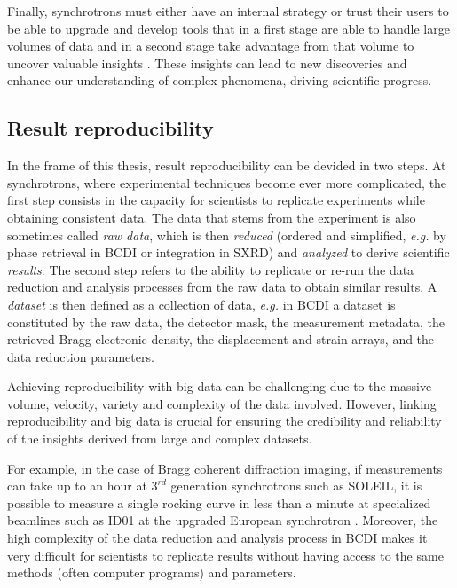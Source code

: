 Finally, synchrotrons must either have an internal strategy or trust their users to be able to upgrade and develop tools that in a first stage are able to handle large volumes of data and in a second stage take advantage from that volume to uncover valuable insights \parencite{WangIEEE2016, Khaleghi2019}.
These insights can lead to new discoveries and enhance our understanding of complex phenomena, driving scientific progress.


\subsection{Result reproducibility}

In the frame of this thesis, result reproducibility can be devided in two steps.
At synchrotrons, where experimental techniques become ever more complicated, the first step consists in the capacity for scientists to replicate experiments while obtaining consistent data.
The data that stems from the experiment is also sometimes called \textit{raw data}, which is then \textit{reduced} (ordered and simplified, \textit{e.g.} by phase retrieval in BCDI or integration in SXRD) and \textit{analyzed} to derive scientific \textit{results}.
The second step refers to the ability to replicate or re-run the data reduction and analysis processes from the raw data to obtain similar results.
A \textit{dataset} is then defined as a collection of data, \textit{e.g.} in BCDI a dataset is constituted by the raw data, the detector mask, the measurement metadata, the retrieved Bragg electronic density, the displacement and strain arrays, and the data reduction parameters.

Achieving reproducibility with big data can be challenging due to the massive volume, velocity, variety and complexity of the data involved.
However, linking reproducibility and big data is crucial for ensuring the credibility and reliability of the insights derived from large and complex datasets.

For example, in the case of Bragg coherent diffraction imaging, if measurements can take up to an hour at $3^{rd}$ generation synchrotrons such as SOLEIL, it is possible to measure a single rocking curve in less than a minute at specialized beamlines such as ID01 at the upgraded European synchrotron \parencite{Richter2019}.
Moreover, the high complexity of the data reduction and analysis process in BCDI makes it very difficult for scientists to replicate results without having access to the same methods (often computer programs) and parameters.

